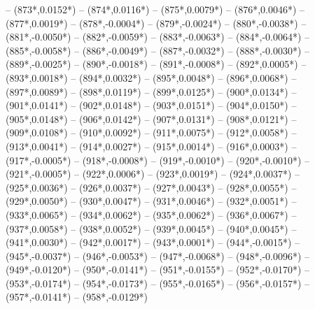 {		-- ({873*\dx},{0.0152*\dy})
		-- ({874*\dx},{0.0116*\dy})
		-- ({875*\dx},{0.0079*\dy})
		-- ({876*\dx},{0.0046*\dy})
		-- ({877*\dx},{0.0019*\dy})
		-- ({878*\dx},{-0.0004*\dy})
		-- ({879*\dx},{-0.0024*\dy})
		-- ({880*\dx},{-0.0038*\dy})
		-- ({881*\dx},{-0.0050*\dy})
		-- ({882*\dx},{-0.0059*\dy})
		-- ({883*\dx},{-0.0063*\dy})
		-- ({884*\dx},{-0.0064*\dy})
		-- ({885*\dx},{-0.0058*\dy})
		-- ({886*\dx},{-0.0049*\dy})
		-- ({887*\dx},{-0.0032*\dy})
		-- ({888*\dx},{-0.0030*\dy})
		-- ({889*\dx},{-0.0025*\dy})
		-- ({890*\dx},{-0.0018*\dy})
		-- ({891*\dx},{-0.0008*\dy})
		-- ({892*\dx},{0.0005*\dy})
		-- ({893*\dx},{0.0018*\dy})
		-- ({894*\dx},{0.0032*\dy})
		-- ({895*\dx},{0.0048*\dy})
		-- ({896*\dx},{0.0068*\dy})
		-- ({897*\dx},{0.0089*\dy})
		-- ({898*\dx},{0.0119*\dy})
		-- ({899*\dx},{0.0125*\dy})
		-- ({900*\dx},{0.0134*\dy})
		-- ({901*\dx},{0.0141*\dy})
		-- ({902*\dx},{0.0148*\dy})
		-- ({903*\dx},{0.0151*\dy})
		-- ({904*\dx},{0.0150*\dy})
		-- ({905*\dx},{0.0148*\dy})
		-- ({906*\dx},{0.0142*\dy})
		-- ({907*\dx},{0.0131*\dy})
		-- ({908*\dx},{0.0121*\dy})
		-- ({909*\dx},{0.0108*\dy})
		-- ({910*\dx},{0.0092*\dy})
		-- ({911*\dx},{0.0075*\dy})
		-- ({912*\dx},{0.0058*\dy})
		-- ({913*\dx},{0.0041*\dy})
		-- ({914*\dx},{0.0027*\dy})
		-- ({915*\dx},{0.0014*\dy})
		-- ({916*\dx},{0.0003*\dy})
		-- ({917*\dx},{-0.0005*\dy})
		-- ({918*\dx},{-0.0008*\dy})
		-- ({919*\dx},{-0.0010*\dy})
		-- ({920*\dx},{-0.0010*\dy})
		-- ({921*\dx},{-0.0005*\dy})
		-- ({922*\dx},{0.0006*\dy})
		-- ({923*\dx},{0.0019*\dy})
		-- ({924*\dx},{0.0037*\dy})
		-- ({925*\dx},{0.0036*\dy})
		-- ({926*\dx},{0.0037*\dy})
		-- ({927*\dx},{0.0043*\dy})
		-- ({928*\dx},{0.0055*\dy})
		-- ({929*\dx},{0.0050*\dy})
		-- ({930*\dx},{0.0047*\dy})
		-- ({931*\dx},{0.0046*\dy})
		-- ({932*\dx},{0.0051*\dy})
		-- ({933*\dx},{0.0065*\dy})
		-- ({934*\dx},{0.0062*\dy})
		-- ({935*\dx},{0.0062*\dy})
		-- ({936*\dx},{0.0067*\dy})
		-- ({937*\dx},{0.0058*\dy})
		-- ({938*\dx},{0.0052*\dy})
		-- ({939*\dx},{0.0045*\dy})
		-- ({940*\dx},{0.0045*\dy})
		-- ({941*\dx},{0.0030*\dy})
		-- ({942*\dx},{0.0017*\dy})
		-- ({943*\dx},{0.0001*\dy})
		-- ({944*\dx},{-0.0015*\dy})
		-- ({945*\dx},{-0.0037*\dy})
		-- ({946*\dx},{-0.0053*\dy})
		-- ({947*\dx},{-0.0068*\dy})
		-- ({948*\dx},{-0.0096*\dy})
		-- ({949*\dx},{-0.0120*\dy})
		-- ({950*\dx},{-0.0141*\dy})
		-- ({951*\dx},{-0.0155*\dy})
		-- ({952*\dx},{-0.0170*\dy})
		-- ({953*\dx},{-0.0174*\dy})
		-- ({954*\dx},{-0.0173*\dy})
		-- ({955*\dx},{-0.0165*\dy})
		-- ({956*\dx},{-0.0157*\dy})
		-- ({957*\dx},{-0.0141*\dy})
		-- ({958*\dx},{-0.0129*\dy})
}
